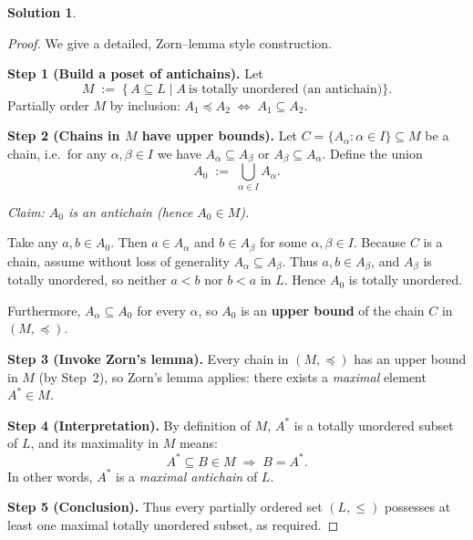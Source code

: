 \documentclass[12pt]{article}
\theoremstyle{definition} %
\newtheorem{solution}{Solution}
\theoremstyle{plain} %
\begin{document}
\begin{solution}
  \begin{proof}
    We give a detailed, Zorn--lemma style construction.
    
    \bigskip
    \textbf{Step 1 (Build a poset of antichains).}
    Let
    \[
      M \;:=\;
      \{\,A\subseteq L \mid A\ \text{is totally unordered (an antichain)}\}.
    \]
    Partially order $M$ by inclusion:
    $A_1\preceq A_2 \;\Longleftrightarrow\; A_1\subseteq A_2$.
    
    \bigskip
    \textbf{Step 2 (Chains in $M$ have upper bounds).}
    Let
    \(
      C=\{A_\alpha : \alpha\in I\}
      \subseteq M
    \)
    be a chain, i.e.\ for any $\alpha,\beta\in I$ we have
    $A_\alpha\subseteq A_\beta$ or $A_\beta\subseteq A_\alpha$.
    Define the union
    \[
      A_0 \;:=\; \bigcup_{\alpha\in I} A_\alpha.
    \]
    
    \smallskip
    \emph{Claim: $A_0$ is an antichain (hence $A_0\in M$).}
    
    Take any $a,b\in A_0$.
    Then $a\in A_{\alpha}$ and $b\in A_{\beta}$ for some
    $\alpha,\beta\in I$.
    Because $C$ is a chain, assume without loss of generality
    $A_{\alpha}\subseteq A_{\beta}$.
    Thus $a,b\in A_{\beta}$, and $A_{\beta}$ is totally unordered,
    so neither $a<b$ nor $b<a$ in $L$.
    Hence $A_0$ is totally unordered.
    
    \smallskip
    Furthermore, $A_\alpha\subseteq A_0$ for every $\alpha$,
    so $A_0$ is an \textbf{upper bound} of the chain $C$ in $(M,\preceq)$.
    
    \bigskip
    \textbf{Step 3 (Invoke Zorn’s lemma).}
    Every chain in $(M,\preceq)$ has an upper bound in $M$
    (by Step~2), so Zorn’s lemma applies:
    there exists a \emph{maximal} element $A^\ast\in M$.
    
    \bigskip
    \textbf{Step 4 (Interpretation).}
    By definition of $M$,
    $A^\ast$ is a totally unordered subset of $L$,
    and its maximality in $M$ means:
    \[
      A^\ast\subseteq B\in M \;\Longrightarrow\; B=A^\ast.
    \]
    In other words, $A^\ast$ is a \emph{maximal antichain} of $L$.
    
    \bigskip
    \textbf{Step 5 (Conclusion).}
    Thus every partially ordered set $(L,\le)$ possesses
    at least one maximal totally unordered subset, as required.
    \end{proof}
\end{solution}
\end{document}
